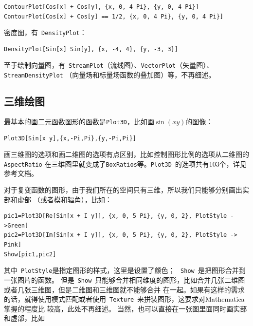 \documentclass[UTF8,a4paper,10pt]{ctexart}
\begin{document}
\begin{lstlisting}
ContourPlot[Cos[x] + Cos[y], {x, 0, 4 Pi}, {y, 0, 4 Pi}]
ContourPlot[Cos[x] + Cos[y] == 1/2, {x, 0, 4 Pi}, {y, 0, 4 Pi}]
\end{lstlisting}

密度图，有~\verb|DensityPlot|：

\begin{lstlisting}
DensityPlot[Sin[x] Sin[y], {x, -4, 4}, {y, -3, 3}]
\end{lstlisting}

至于绘制向量图，有~\verb|StreamPlot|（流线图）、\verb|VectorPlot|（矢量图）、\verb|StreamDensityPlot|
（向量场和标量场函数的叠加图）等，不再细述。

\subsection{三维绘图}

最基本的画二元函数图形的函数是\verb|Plot3D|，比如画$\sin(x y)$的图像：

\begin{lstlisting}
Plot3D[Sin[x y],{x,-Pi,Pi},{y,-Pi,Pi}]
\end{lstlisting}

画三维图的选项和画二维图的选项有点区别，比如控制图形比例的选项从二维图的\verb|AspectRatio|
在三维图里就变成了\verb|BoxRatios|等。\verb|Plot3D|~的选项共有103个，详见参考文档。

对于复变函数的图形，由于我们所在的空间只有三维，所以我们只能够分别画出实部和虚部
（或者模和辐角），比如：


\begin{lstlisting}
pic1=Plot3D[Re[Sin[x + I y]], {x, 0, 5 Pi}, {y, 0, 2}, PlotStyle ->Green]
pic2=Plot3D[Im[Sin[x + I y]], {x, 0, 5 Pi}, {y, 0, 2}, PlotStyle -> Pink]
Show[pic1,pic2]
\end{lstlisting}
其中~\verb|PlotStyle|是指定图形的样式，这里是设置了颜色；
~\verb|Show|~是把图形合并到一张图片的函数。
但是~\verb|Show|~只能够合并相同维度的图形，比如合并几张二维图或者几张三维图，但是二维图和三维图就不能够合并
在一起。如果有这样的需求的话，就得使用模式匹配或者使用~\verb|Texture|~来拼装图形，这要求对Mathematica掌握的程度比
较高，此处不再细述。
当然，也可以直接在一张图里面同时画实部和虚部，比如
\end{document}
